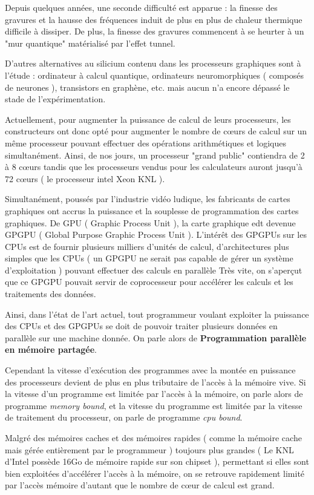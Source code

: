 \documentclass[fleqn,11pt]{article}
\begin{document}
Depuis quelques années, une seconde difficulté est apparue : la finesse des gravures et la hausse des fréquences induit de plus en plus de chaleur thermique difficile à dissiper. De plus, la finesse des gravures commencent à se heurter à un "mur quantique" matérialisé par l'effet tunnel.

D'autres alternatives au silicium contenu dans les processeurs graphiques sont à l'étude : ordinateur à calcul quantique, ordinateurs neuromorphiques ( composés de neurones ), transistors en graphène, etc. mais aucun n'a encore dépassé le stade de l'expérimentation. 

Actuellement, pour augmenter la puissance de calcul de leurs processeurs, les constructeurs ont donc opté pour augmenter le nombre de c{\oe}urs de calcul sur un même processeur pouvant effectuer des opérations arithmétiques et logiques simultanément. Ainsi,  de nos jours, un processeur "grand public" contiendra de 2 à 8 c{\oe}urs tandis que les processeurs vendus pour les calculateurs auront jusqu'à 72 c{\oe}urs ( le processeur intel Xeon KNL ).

Simultanément, poussés par l'industrie vidéo ludique, les fabricants de cartes graphiques ont accrus la puissance et la souplesse de programmation des cartes graphiques. De GPU ( Graphic Process Unit ), la carte graphique edt devenue GPGPU ( Global Purpose Graphic Process Unit ). L'intérêt des GPGPUs sur les CPUs est de fournir plusieurs milliers d'unités de calcul, d'architectures plus simples que les CPUs ( un GPGPU ne serait pas capable de gérer un système d'exploitation ) pouvant effectuer des calculs en parallèle 
Très vite, on s'aperçut que ce GPGPU pouvait servir de coprocesseur pour accélérer les calculs et les traitements des données. 

Ainsi, dans l'état de l'art actuel, tout programmeur voulant exploiter la puissance des CPUs et des GPGPUs se doit de pouvoir traiter plusieurs données en parallèle sur une machine donnée. On parle alors de \textbf{Programmation parallèle en mémoire partagée}.

Cependant la vitesse d'exécution des programmes avec la montée en puissance des processeurs devient de plus en plus tributaire de l'accès à la mémoire vive. Si la vitesse d'un programme est limitée par l'accès à la mémoire,  on parle alors de programme \textsl{memory bound}, et la vitesse du programme est limitée par la vitesse de traitement du processeur, on parle de programme \textsl{cpu bound}.

Malgré des mémoires caches et des mémoires rapides ( comme la mémoire cache mais gérée entièrement par le programmeur )  toujours plus grandes ( Le KNL d'Intel possède 16Go de mémoire rapide sur son chipset ), permettant si elles sont bien exploitées d'accélérer l'accès à la mémoire, on se retrouve rapidement limité par l'accès mémoire d'autant que le nombre de cœur de calcul est grand.
\end{document}
